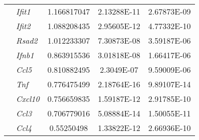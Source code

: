 \begin{table}[ht!]
\begin{tabularx}{\textwidth}{xxCCC}
      & \textit{Ifit1} & 1.166817047 & \num{2.13288E-11} & \num{2.67873E-09} \\
     & \textit{Ifit2} &	1.088208435 & \num{2.95605E-12} & \num{4.77332E-10} \\
     & \textit{Rsad2} &	1.012233307 &	\num{7.30873E-08} & \num{3.59187E-06} \\
     & \textit{Ifnb1} &	0.863915536 & \num{3.01818E-08} & \num{1.66417E-06} \\
     & \textit{Ccl5} &	0.810882495 & \num{2.3049E-07} & \num{9.59009E-06}	 \\
     & \textit{Tnf} & 0.776475499 & \num{2.18764E-16} & \num{9.89107E-14} \\
     & \textit{Cxcl10} & 0.756659835 & \num{1.59187E-12} & \num{2.91785E-10} \\
     & \textit{Ccl3} & 0.706779016 &\num{5.08884E-14} &	\num{1.50055E-11} \\
     & \textit{Ccl4} & 0.55250498 & \num{1.33822E-12} & \num{2.66936E-10}	 \\
     
     \midrule


\end{tabularx}
\end{table}
